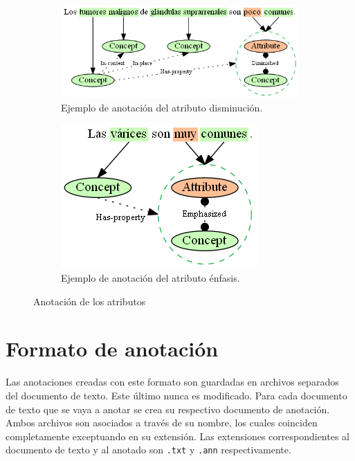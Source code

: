 \begin{figure}[H]
	\begin{subfigure}{4.2in}
		\includegraphics[width=\linewidth]{graphics/annotation_example_attribute_diminished.png}
		\caption{Ejemplo de anotación del atributo disminución.}
		\vspace{0.3in}
		\label{fig:annotation_example_attribute_diminished}
	\end{subfigure}
	\begin{subfigure}{2.3in}
		\includegraphics[width=\linewidth]{graphics/annotation_example_attribute_emphasized.png}
		\caption{Ejemplo de anotación del atributo énfasis.}
		\label{fig:annotation_example_attribute_emphasized}
	\end{subfigure}
	\caption{Anotación de los atributos}
	\label{fig:annotation_examples_attributes}
\end{figure}

\section{Formato de anotación}
\label{section:annotation_file_format}
Las anotaciones creadas con este formato son guardadas en archivos separados del documento de texto. Este último nunca es modificado. Para cada documento de texto que se vaya a anotar se crea su respectivo documento de anotación. Ambos archivos son asociados a través de su nombre, los cuales coinciden completamente exceptuando en su extensión. Las extensiones correspondientes al documento de texto y al anotado son \texttt{.txt} y \texttt{.ann} respectivamente.

